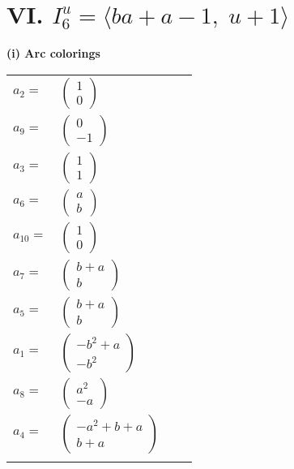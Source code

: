 \documentclass[1p]{elsarticle_modified}
\theoremstyle{definition}
\begin{document}
\centering \section*{VI. $I^u_{6}= \langle b a+a-1,\;u+1 \rangle$}
\flushleft \textbf{(i) Arc colorings}\\
\begin{tabular}{m{7pt} m{180pt} m{7pt} m{180pt} }
\flushright $a_{2}=$&$\begin{pmatrix}1\\0\end{pmatrix}$ \\
\flushright $a_{9}=$&$\begin{pmatrix}0\\-1\end{pmatrix}$ \\
\flushright $a_{3}=$&$\begin{pmatrix}1\\1\end{pmatrix}$ \\
\flushright $a_{6}=$&$\begin{pmatrix}a\\b\end{pmatrix}$ \\
\flushright $a_{10}=$&$\begin{pmatrix}1\\0\end{pmatrix}$ \\
\flushright $a_{7}=$&$\begin{pmatrix}b+a\\b\end{pmatrix}$ \\
\flushright $a_{5}=$&$\begin{pmatrix}b+a\\b\end{pmatrix}$ \\
\flushright $a_{1}=$&$\begin{pmatrix}- b^2+a\\- b^2\end{pmatrix}$ \\
\flushright $a_{8}=$&$\begin{pmatrix}a^2\\- a\end{pmatrix}$ \\
\flushright $a_{4}=$&$\begin{pmatrix}- a^2+b+a\\b+a\end{pmatrix}$\\&\end{tabular}
\end{document}
